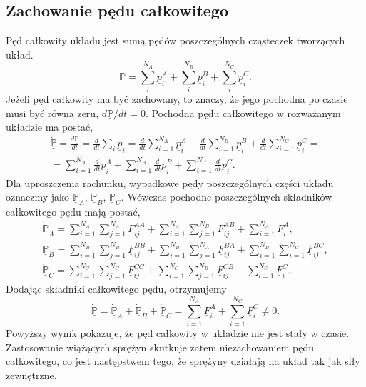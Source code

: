 \documentclass[12pt,a4paper,openright]{report} %
\begin{document}
\subsection{Zachowanie pędu całkowitego}
\label{ped1}
Pęd całkowity układu jest sumą pędów poszczególnych cząsteczek tworzących układ. 
\begin{equation}
\underline{\mathbb{P}}=\sum_{i}^{N_A}\underline{p}_{i}^{A}+\sum_{i}^{N_B}\underline{p}_{i}^{B}+\sum_{i}^{N_C}\underline{p}_{i}^{C}.
\end{equation}
%
Jeżeli pęd całkowity ma być zachowany, to znaczy, że jego pochodna po czasie musi być równa zeru, $d \underline{\mathbb{P}}/dt = 0$. Pochodna pędu całkowitego w rozważanym układzie ma postać,
\begin{equation}
\begin{gathered}
\underline{\mathbb{\dot{P}}}=\frac{d\underline{\mathbb{P}}}{dt}=\frac{d}{dt}\sum_i \underline{p}_i =
\frac{d}{dt} \sum_{i=1}^{N_A} \underline{p}_i^A + \frac{d}{dt}
\sum_{i=1}^{N_B} \underline{p}_i^B + \frac{d}{dt}
\sum_{i=1}^{N_C} \underline{p}_i^C =
\\
=\sum_{i=1}^{N_A} \frac{d}{dt}\underline{p}_i^A + 
\sum_{i=1}^{N_B} \frac{d}{dt}\underline{p}_i^B + 
\sum_{i=1}^{N_C} \frac{d}{dt}\underline{p}_i^C.
\end{gathered}
\end{equation}
%
Dla uproszczenia rachunku, wypadkowe pędy poszczególnych części układu oznaczmy jako $\underline{\mathbb{P}}_A$, $\underline{\mathbb{P}}_B$, $\underline{\mathbb{P}}_C$. Wówczas pochodne poszczególnych składników całkowitego pędu mają postać,
\begin{equation}
\begin{gathered}
\underline{\dot{\mathbb{P}}}_A=\sum_{i=1}^{N_A}\sum_{j=1}^{N_A}\underline{F}_{ij}^{AA}
+ \sum_{i=1}^{N_A}\sum_{j=1}^{N_B}\underline{F}_{ij}^{AB} +
\sum_{i=1}^{N_A}\underline{F}_i^{A},
%
\\
%
\underline{\dot{\mathbb{P}}}_B=\sum_{i=1}^{N_B}\sum_{j=1}^{N_B}\underline{F}_{ij}^{BB}
+ \sum_{i=1}^{N_B}\sum_{j=1}^{N_A}\underline{F}_{ij}^{BA} +
\sum_{i=1}^{N_B} \sum_{i=1}^{N_C} \underline{F}_{ij}^{BC},
%
\\
%
\underline{\dot{\mathbb{P}}}_C=\sum_{i=1}^{N_C}\sum_{j=1}^{N_C}\underline{F}_{ij}^{CC}
+ \sum_{i=1}^{N_C}\sum_{j=1}^{N_B}\underline{F}_{ij}^{CB} +
\sum_{i=1}^{N_C}\underline{F}_i^{C}.
\end{gathered}
\end{equation}
%
Dodając składniki całkowitego pędu, otrzymujemy
\begin{equation}
\underline{\dot{\mathbb{P}}}=\underline{\dot{\mathbb{P}}}_A+\underline{\dot{\mathbb{P}}}_B+\underline{\dot{\mathbb{P}}}_C=\sum_{i=1}^{N_A}\underline{F}_{i}^{A}+\sum_{i=1}^{N_C}\underline{F}_{i}^{C} \ne 0.
\end{equation}
%
Powyższy wynik pokazuje, że pęd całkowity w układzie nie jest stały w czasie. Zastosowanie wiążących sprężyn skutkuje zatem niezachowaniem pędu całkowitego, co jest następstwem tego, że sprężyny działają na układ tak jak siły zewnętrzne.
%
\end{document}
